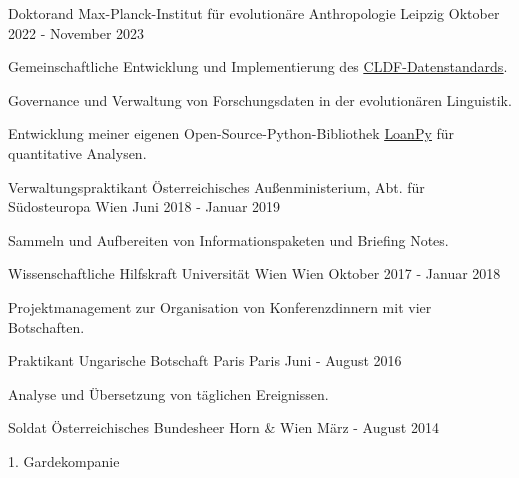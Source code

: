 \begin{cventries}

  \cventry
    {Doktorand} %
    {Max-Planck-Institut für evolutionäre Anthropologie} %
    {Leipzig} %
    {Oktober 2022 - November 2023} %
    {
      \begin{cvitems} %
      \item{Gemeinschaftliche Entwicklung und Implementierung des \underline{\href{https://cldf.clld.org/}{CLDF-Datenstandards}}.}
      \item{Governance und Verwaltung von Forschungsdaten in der evolutionären Linguistik.}
      \item{Entwicklung meiner eigenen Open-Source-Python-Bibliothek \underline{\href{https://pypi.org/project/loanpy/}{LoanPy}} für quantitative Analysen.}
      \end{cvitems}
    }
    
  \cventry
    {Verwaltungspraktikant} %
    {Österreichisches Außenministerium, Abt. für Südosteuropa} %
    {Wien} %
    {Juni 2018 - Januar 2019} %
    {
      \begin{cvitems} %
        \item{Sammeln und Aufbereiten von Informationspaketen und Briefing Notes.}
      \end{cvitems}
    }

  \cventry
    {Wissenschaftliche Hilfskraft} %
    {Universität Wien} %
    {Wien} %
    {Oktober 2017 - Januar 2018} %
    {
    \begin{cvitems}
    \item{Projektmanagement zur Organisation von Konferenzdinnern mit vier Botschaften.}
    \end{cvitems}
    }
    
  \cventry
    {Praktikant} %
    {Ungarische Botschaft Paris} %
    {Paris} %
    {Juni - August 2016} %
    {
    \begin{cvitems}
    \item{Analyse und Übersetzung von täglichen Ereignissen.}
    \end{cvitems}
    }

  \cventry
    {Soldat} %
    {Österreichisches Bundesheer} %
    {Horn \& Wien} %
    {März - August 2014} %
    {
    \begin{cvitems}
    \item{1. Gardekompanie}
    \end{cvitems}
    }
        
\end{cventries}
